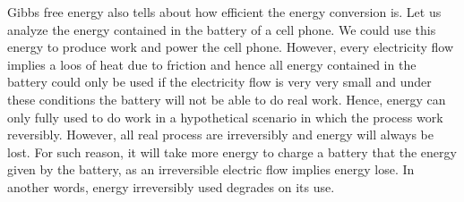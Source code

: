 \documentclass[main.tex]{subfiles}
\begin{document}
Gibbs free energy also tells about how efficient the energy conversion is. Let us analyze the energy contained in the battery of a cell phone. We could use this energy to produce work and power the cell phone. However, every electricity flow implies a loos of heat due to friction and hence all energy contained in the battery could only be used if the electricity flow is very very small and under these conditions the battery will not be able to do real work. Hence, energy can only fully used to do work in a hypothetical scenario in which the process work reversibly. However, all real process are irreversibly and energy will always be lost. For such reason, it will take more energy to charge a battery that the energy given by the battery, as an irreversible electric flow implies energy lose. In another words, energy irreversibly used degrades on its use.
\end{document}
